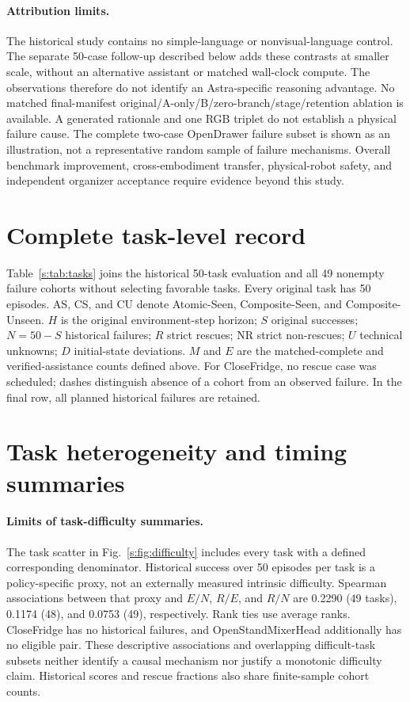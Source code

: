 \paragraph{Attribution limits.}
The historical study contains no simple-language or nonvisual-language control. The separate 50-case follow-up described below adds these contrasts at smaller scale, without an alternative assistant or matched wall-clock compute. The observations therefore do not identify an Astra-specific reasoning advantage. No matched final-manifest original/A-only/B/zero-branch/stage/retention ablation is available. A generated rationale and one RGB triplet do not establish a physical failure cause. The complete two-case OpenDrawer failure subset is shown as an illustration, not a representative random sample of failure mechanisms. Overall benchmark improvement, cross-embodiment transfer, physical-robot safety, and independent organizer acceptance require evidence beyond this study.



\clearpage
\onecolumn
\section{Complete task-level record}
\label{s:tasks}
Table~\ref{s:tab:tasks} joins the historical 50-task evaluation and all 49 nonempty failure cohorts without selecting favorable tasks. Every original task has 50 episodes. AS, CS, and CU denote Atomic-Seen, Composite-Seen, and Composite-Unseen. $H$ is the original environment-step horizon; $S$ original successes; $N=50-S$ historical failures; $R$ strict rescues; NR strict non-rescues; $U$ technical unknowns; $D$ initial-state deviations. $M$ and $E$ are the matched-complete and verified-assistance counts defined above. For CloseFridge, no rescue case was scheduled; dashes distinguish absence of a cohort from an observed failure. In the final row, all planned historical failures are retained.


\clearpage
\section{Task heterogeneity and timing summaries}
\paragraph{Limits of task-difficulty summaries.}
The task scatter in Fig.~\ref{s:fig:difficulty} includes every task with a defined corresponding denominator. Historical success over 50 episodes per task is a policy-specific proxy, not an externally measured intrinsic difficulty. Spearman associations between that proxy and $E/N$, $R/E$, and $R/N$ are 0.2290 (49 tasks), 0.1174 (48), and 0.0753 (49), respectively. Rank ties use average ranks. CloseFridge has no historical failures, and OpenStandMixerHead additionally has no eligible pair. These descriptive associations and overlapping difficult-task subsets neither identify a causal mechanism nor justify a monotonic difficulty claim. Historical scores and rescue fractions also share finite-sample cohort counts.

